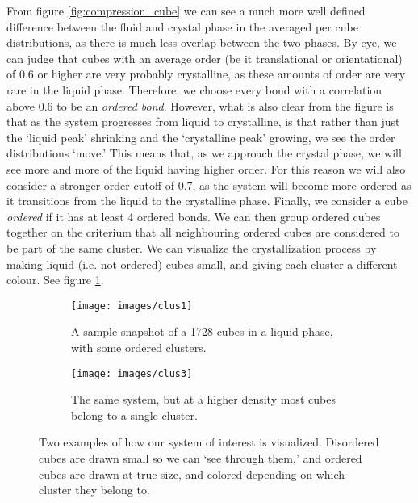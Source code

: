 \documentclass[thesis]{subfiles}
\begin{document}
From figure \ref{fig:compression_cube} we can see a much more well defined difference between the fluid and crystal phase in the averaged per cube distributions, as there is much less overlap between the two phases. By eye, we can judge that cubes with an average order (be it translational or orientational) of 0.6 or higher are very probably crystalline, as these amounts of order are very rare in the liquid phase. Therefore, we choose every bond with a correlation above 0.6 to be an \emph{ordered bond}. However, what is also clear from the figure is that as the system progresses from liquid to crystalline, is that rather than just the `liquid peak' shrinking and the `crystalline peak' growing, we see the order distributions `move.' This means that, as we approach the crystal phase, we will see more and more of the liquid having higher order. For this reason we will also consider a stronger order cutoff of 0.7, as the system will become more ordered as it transitions from the liquid to the crystalline phase.
Finally, we consider a cube \emph{ordered} if it has at least 4 ordered bonds. We can then group ordered cubes together on the criterium that all neighbouring ordered cubes are considered to be part of the same cluster. We can visualize the crystallization process by making liquid (i.e. not ordered) cubes small, and giving each cluster a different colour. See figure \ref{fig:sample_snapshot}.

\begin{figure}[H]
\centering
\begin{subfigure}{0.48\textwidth}
\centering
\texttt{[image: images/clus1]}
\caption{A sample snapshot of a 1728 cubes in a liquid phase, with some ordered clusters.}
\end{subfigure}\hfill
\begin{subfigure}{0.48\textwidth}
\centering
\texttt{[image: images/clus3]}
\caption{The same system, but at a higher density most cubes belong to a single cluster.}
\end{subfigure}
\caption{Two examples of how our system of interest is visualized. Disordered cubes are drawn small so we can `see through them,' and ordered cubes are drawn at true size, and colored depending on which cluster they belong to.}
\label{fig:sample_snapshot}
\end{figure}

\end{document}

